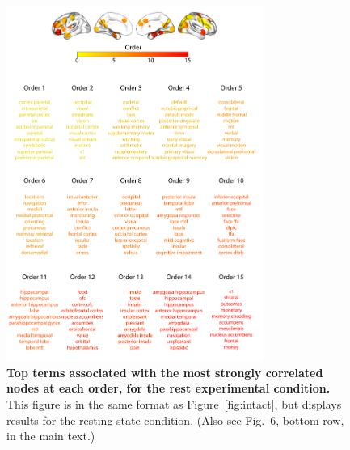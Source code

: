\documentclass[english]{article}
\newcommand{\neurosynth}{6}
\begin{document}
\begin{figure}[p!]
\centering
\includegraphics[width=0.75\textwidth]{figs/supp_15_rest}
\caption{\textbf{Top terms associated with the most strongly
      correlated nodes at each order, for the rest experimental
    condition.}  This figure is in the same format as
  Figure~\ref{fig:intact}, but displays results for the
  resting state condition.  (Also see Fig.~\neurosynth,
bottom row, in the main text.)}
\label{fig:rest}
\end{figure}
\end{document}
